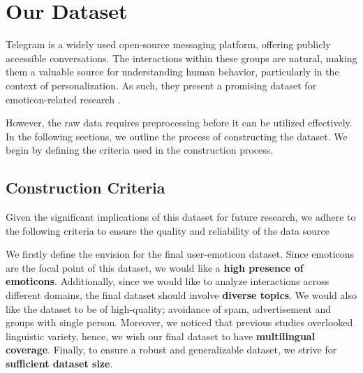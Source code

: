 \section{Our Dataset}
Telegram \cite{telegram_tos} is a widely used open-source messaging platform, offering publicly accessible conversations. The interactions within these groups are natural, making them a valuable source for understanding human behavior, particularly in the context of personalization. As such, they present a promising dataset for emoticon-related research \cite{analysis-of-telegram-an-instant-messaging-service, analyzing-predicting-news, pushshift, unearthing, data-collection-opportunies, tgdataset}.

However, the raw data requires preprocessing before it can be utilized effectively. In the following sections, we outline the process of constructing the dataset. We begin by defining the criteria used in the construction process.



\subsection{Construction Criteria}
Given the significant implications of this dataset for future research, we adhere to the following criteria to ensure the quality and reliability of the data source 

We firstly define the envision for the final user-emoticon dataset. Since emoticons are the focal point of this dataset, we would like a \textbf{high presence of emoticons}. Additionally, since we would like to analyze interactions across different domains, the final dataset should involve \textbf{diverse topics}. We would also like the dataset to be of high-quality; avoidance of spam, advertisement and groups with single person. Moreover, we noticed that previous studies overlooked linguistic variety, hence, we wish our final dataset to have \textbf{multilingual coverage}. Finally, to ensure a robust and generalizable dataset, we strive for \textbf{sufficient dataset size}. 


